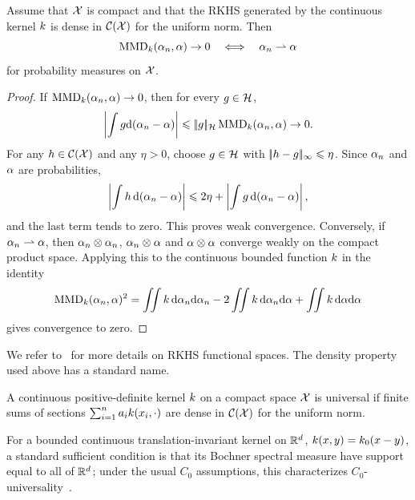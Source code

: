 \begin{prop}\label{prop-mmd-metrization}
	Assume that $\mathcal{X}$ is compact and that the RKHS generated by the continuous kernel $k$ is dense in $\mathcal{C}(\mathcal{X})$ for the uniform norm. Then
	\[
		\operatorname{MMD}_{k}(\alpha_n,\alpha)\to0
		\quad\Longleftrightarrow\quad
		\alpha_n\rightharpoonup\alpha
	\]
	for probability measures on $\mathcal{X}$.
\end{prop}
\begin{proof}
	If $\operatorname{MMD}_{k}(\alpha_n,\alpha)\to0$, then for every $g\in\mathcal{H}$,
	\[
		\left\lvert\int g\mathrm{d}(\alpha_n-\alpha)\right\rvert
		\leqslant |\!| g |\!|_{\mathcal{H}}\operatorname{MMD}_{k}(\alpha_n,\alpha)\to0.
	\]
	For any $h\in\mathcal{C}(\mathcal{X})$ and any $\eta>0$, choose $g\in\mathcal{H}$ with $|\!| h-g |\!|_\infty\leqslant\eta$. Since $\alpha_n$ and $\alpha$ are probabilities,
	\[
		\left|\int h\,\mathrm{d}(\alpha_n-\alpha)\right|
		\leqslant
		2\eta+\left|\int g\,\mathrm{d}(\alpha_n-\alpha)\right|,
	\]
	and the last term tends to zero. This proves weak convergence. Conversely, if $\alpha_n\rightharpoonup\alpha$, then $\alpha_n\otimes\alpha_n$, $\alpha_n\otimes\alpha$ and $\alpha\otimes\alpha$ converge weakly on the compact product space. Applying this to the continuous bounded function $k$ in the identity
	\[
		\MMD_{\Krkhs}(\al_n,\al)^2
\index{maximum mean discrepancy}%
		=
		\iint \Krkhs\,\d\al_n\d\al_n
		-2\iint \Krkhs\,\d\al_n\d\al
		+\iint \Krkhs\,\d\al\d\al
	\]
	gives convergence to zero.
\end{proof}


We refer to~\cite{berlinet03reproducing,Hofmann2008,scholkopf2002learning} for more details on RKHS functional spaces. The density property used above has a standard name.

\begin{defn}\label{def-universal-kernel}
	A continuous positive-definite kernel $k$ on a compact space $\mathcal{X}$ is universal if finite sums of sections $\sum_{i=1}^n a_ik(x_i,\cdot)$ are dense in $\mathcal{C}(\mathcal{X})$ for the uniform norm.
\end{defn}

\begin{rem}
For a bounded continuous translation-invariant kernel on $\mathbb{R}^d$, $k(x,y)=k_0(x-y)$, a standard sufficient condition is that its Bochner spectral measure have support equal to all of $\mathbb{R}^d$; under the usual $C_0$ assumptions, this characterizes $C_0$-universality~\cite{sriperumbudur2008injective,sriperumbudur2012empirical}.
\end{rem}

